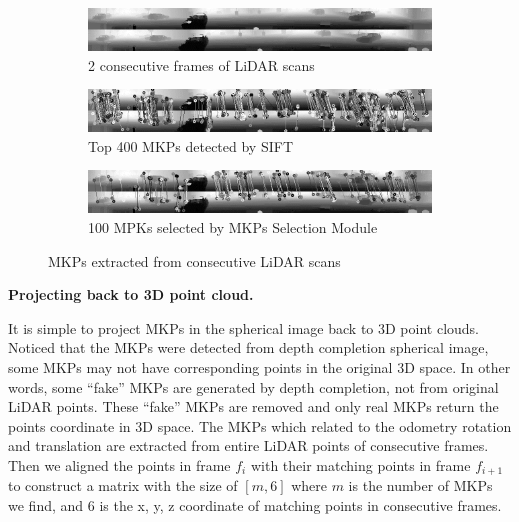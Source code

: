 \documentclass[sigconf]{acmart}
\newcommand{\bfsection}[1]{\vspace*{0.1cm}\noindent\textbf{#1.}}
\begin{document}
\begin{figure}[h]
     \centering
     \begin{subfigure}[b]{0.8\textwidth}
         \centering
         \includegraphics[width=\textwidth]{Figures/MKP a.png}
         \caption{2 consecutive frames of LiDAR scans}
     \end{subfigure}

     \begin{subfigure}[b]{0.8\textwidth}
         \centering
         \includegraphics[width=\textwidth]{Figures/MKP b.png}
         \caption{Top 400 MKPs detected by SIFT}
     \end{subfigure}
     
     \begin{subfigure}[b]{0.8\textwidth}
         \centering
         \includegraphics[width=\textwidth]{Figures/MKP c.png}
         \caption{100 MPKs selected by MKPs Selection Module}
     \end{subfigure}
     
        \caption{MKPs extracted from consecutive LiDAR scans}
        \label{fig:MKPs}
\end{figure}


\bfsection{Projecting back to 3D point cloud}

It is simple to project MKPs in the spherical image back to 3D point clouds. Noticed that the MKPs were detected from depth completion spherical image, some MKPs may not have corresponding points in the original 3D space. In other words, some “fake” MKPs are generated by depth completion, not from original LiDAR points. These “fake” MKPs are removed and only real MKPs return the points coordinate in 3D space. The MKPs which related to the odometry rotation and translation are extracted from entire LiDAR points of consecutive frames. Then we aligned the points in frame $f_i$ with their matching points in frame $f_{i+1}$ to construct a matrix with the size of $[m , 6]$ where $m$ is the number of MKPs we find, and 6 is the x, y, z coordinate of matching points in consecutive frames. 
\end{document}
